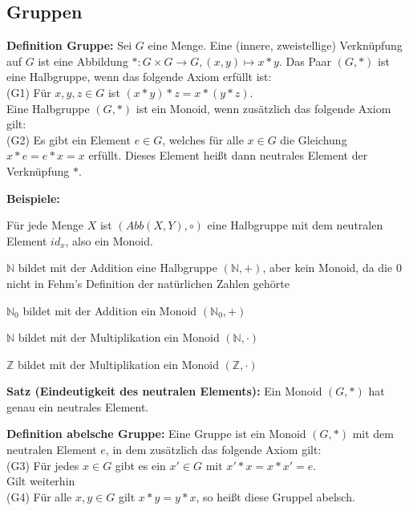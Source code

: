 \documentclass[11pt]{article}
\begin{document}
	\subsection{Gruppen}
		\begin{mdframed}[backgroundcolor=blue!20]
			\textbf{Definition Gruppe:} Sei $G$ eine Menge. Eine (innere, zweistellige) Verkn\"upfung
			auf $G$ ist eine Abbildung $*: G \times G \to G, (x,y) \mapsto x*y$. Das Paar $(G,*)$ ist eine
			Halbgruppe, wenn das folgende Axiom erf\"ullt ist: \\
			(G1) F\"ur $x,y,z \in G$ ist $(x*y)*z=x*(y*z)$. \\
			Eine Halbgruppe $(G,*)$ ist ein Monoid, wenn zus\"atzlich das folgende Axiom gilt: \\
			(G2) Es gibt ein Element $e \in G$, welches f\"ur alle $x \in G$ die Gleichung $x*e=e*x=x$
			erf\"ullt. Dieses Element hei{\ss}t dann neutrales Element der Verkn\"upfung $*$.  
		\end{mdframed}
		
		\textbf{Beispiele:} \\
		\begin{compactitem}
			\item F\"ur jede Menge $X$ ist $(Abb(X,Y), \circ)$ eine Halbgruppe mit dem neutralen Element
			$id_x$, also ein Monoid.
			\item $\mathbb N$ bildet mit der Addition eine Halbgruppe $(\mathbb N,+)$, aber kein Monoid,
			da die 0 nicht in Fehm's Definition der nat\"urlichen Zahlen geh\"orte
			\item $\mathbb N_0$ bildet mit der Addition ein Monoid $(\mathbb N_0,+)$
			\item $\mathbb N$ bildet mit der Multiplikation ein Monoid $(\mathbb N, \cdot)$
			\item $\mathbb Z$ bildet mit der Multiplikation ein Monoid $(\mathbb Z, \cdot)$
		\end{compactitem}
		
		\begin{framed}
			\textbf{Satz (Eindeutigkeit des neutralen Elements):} Ein Monoid $(G,*)$ hat genau ein neutrales
			Element. 
		\end{framed}
		
		\begin{mdframed}[backgroundcolor=blue!20]
			\textbf{Definition abelsche Gruppe:} Eine Gruppe ist ein Monoid $(G,*)$ mit dem neutralen Element
			$e$, in dem zus\"atzlich das folgende Axiom gilt: \\
			(G3) F\"ur jedes $x \in G$ gibt es ein $x' \in G$ mit $x'*x=x*x'=e$. \\
			Gilt weiterhin \\
			(G4) F\"ur alle $x,y \in G$ gilt $x*y=y*x$, so hei{\ss}t diese Gruppel abelsch.
		\end{mdframed}
		
\end{document}
